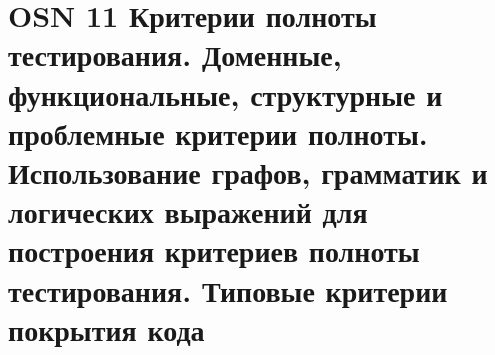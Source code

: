 \section*{OSN 11 Критерии полноты тестирования. Доменные, функциональные, структурные и проблемные критерии полноты. Использование графов, грамматик
и логических выражений для построения критериев полноты тестирования. Типовые критерии покрытия кода}
